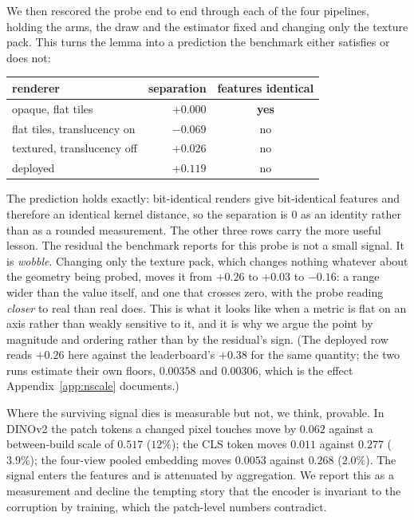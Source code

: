 We then rescored the probe end to end through each of the four pipelines, holding
the arms, the draw and the estimator fixed and changing only the texture pack.
This turns the lemma into a prediction the benchmark either satisfies or does
not:

\begin{center}\small
\begin{tabular}{lrc}
\toprule
renderer & \mvkid{} separation & features identical \\
\midrule
opaque, flat tiles & $\mathbf{+0.000}$ & \textbf{yes} \\
flat tiles, translucency on & $-0.069$ & no \\
textured, translucency off & $+0.026$ & no \\
deployed & $+0.119$ & no \\
\bottomrule
\end{tabular}
\end{center}

The prediction holds exactly: bit-identical renders give bit-identical features
and therefore an identical kernel distance, so the separation is $0$ as an
identity rather than as a rounded measurement. The other three rows carry the
more useful lesson. The residual the benchmark reports for this probe is not a
small signal. It is \emph{wobble}. Changing only the texture pack, which
changes nothing whatever about the geometry being probed, moves it from $+0.26$
to $+0.03$ to $-0.16$: a range wider than the value itself, and one that crosses
zero, with the probe reading \emph{closer} to real than real does. This is what
it looks like when a metric is flat on an axis rather than weakly sensitive to
it, and it is why we argue the point by magnitude and ordering rather than by
the residual's sign. (The deployed row reads $+0.26$ here against the
leaderboard's $+0.38$ for the same quantity; the two runs estimate their own
floors, $0.00358$ and $0.00306$, which is the effect Appendix~\ref{app:nscale}
documents.)

Where the surviving signal dies is measurable but not, we think, provable. In
DINOv2 the patch tokens a changed pixel touches move by $0.062$ against a
between-build scale of $0.517$ ($12\%$); the CLS token moves $0.011$ against
$0.277$ ($3.9\%$); the four-view pooled embedding moves $0.0053$ against
$0.268$ ($2.0\%$). The signal enters the features and is attenuated by
aggregation. We report this as a measurement and decline the tempting story
that the encoder is invariant to the corruption by training, which the
patch-level numbers contradict.

